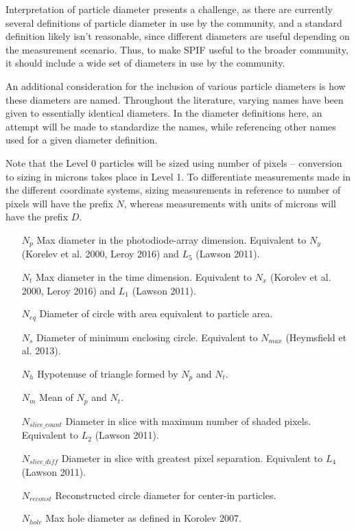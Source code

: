 \documentclass[12pt,a4paper]{article}
\begin{document}
Interpretation of particle diameter presents a challenge, as there are currently several definitions of particle diameter in use by the community, and a standard definition likely isn't reasonable, since different diameters are useful depending on the measurement scenario. Thus, to make SPIF useful to the broader community, it should include a wide set of diameters in use by the community. 

An additional consideration for the inclusion of various particle diameters is how these diameters are named. Throughout the literature, varying names have been given to essentially identical diameters. In the diameter definitions here, an attempt will be made to standardize the names, while referencing other names used for a given diameter definition.

Note that the Level 0 particles will be sized using number of pixels -- conversion to sizing in microns takes place in Level 1. To differentiate measurements made in the different coordinate systems, sizing measurements in reference to number of pixels will have the prefix $N$, whereas measurements with units of microns will have the prefix $D$.

\begin{itemize}
\item [$N_p$] Max diameter in the photodiode-array dimension. Equivalent to $N_y$ (Korelev et al. 2000, Leroy 2016) and $L_5$ (Lawson 2011).
\item[$N_t$] Max diameter in the time dimension. Equivalent to $N_x$ (Korolev et al. 2000, Leroy 2016) and $L_1$ (Lawson 2011).
\item[$N_{eq}$] Diameter of circle with area equivalent to particle area.
\item[$N_s$] Diameter of minimum enclosing circle. Equivalent to $N_{max}$ (Heymsfield et al. 2013).
\item[$N_h$] Hypotenuse of triangle formed by $N_p$ and $N_t$.
\item[$N_m$] Mean of $N_p$ and $N_t$.
\item[$N_{slice\_count}$] Diameter in slice with maximum number of shaded pixels. Equivalent to $L_2$ (Lawson 2011).
\item[$N_{slice\_diff}$] Diameter in slice with greatest pixel separation. Equivalent to $L_4$ (Lawson 2011).
\item[$N_{reconst}$] Reconstructed circle diameter for center-in particles.
\item[$N_{hole}$] Max hole diameter as defined in Korolev 2007.
\end{itemize}
\end{document}
